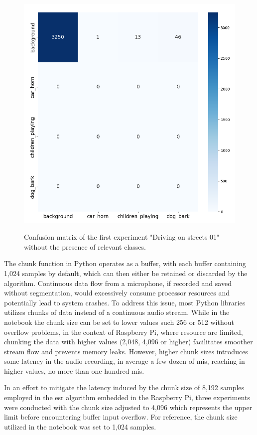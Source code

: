 \begin{figure}[htbp]
    \raggedright
        \caption{Confusion matrix of the first experiment "Driving on streets 01" without the presence of relevant classes.}
        \includegraphics[width=.65\textwidth]{resources/images/060-results/Results_evaluation_driving_streets_01.png}
        \label{fig:Results_evaluation_driving_streets_01}
\end{figure}

The chunk function in Python operates as a buffer, with each buffer containing 1,024 samples by default, which can then either be retained or discarded by the algorithm. Continuous data flow from a microphone, if recorded and saved without segmentation, would excessively consume processor resources and potentially lead to system crashes. To address this issue, most Python libraries utilizes chunks of data instead of a continuous audio stream. While in the notebook the chunk size can be set to lower values such 256 or 512 without overflow problems, in the context of Raspberry Pi, where resource are limited, chunking the data with higher values (2,048, 4,096 or higher) facilitates smoother stream flow and prevents memory leaks. However, higher chunk sizes introduces some latency in the audio recording, in average a few dozen of \gls{mi}\gls{s}, reaching in higher values, no more than one hundred \gls{mi}\gls{s}.

In an effort to mitigate the latency induced by the chunk size of 8,192 samples employed in the \gls{esr} algorithm embedded in the Raspberry Pi, three experiments were conducted with the chunk size adjusted to 4,096 which represents the upper limit before encountering buffer input overflow. For reference, the chunk size utilized in the notebook was set to 1,024 samples. 

